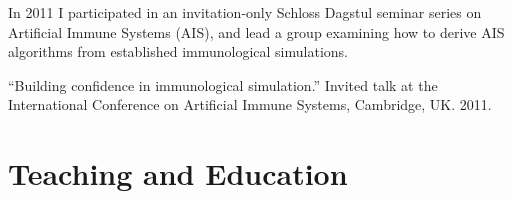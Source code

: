 \documentclass[a4paper]{article}
\begin{document}
In 2011 I participated in an invitation-only Schloss Dagstul seminar series on Artificial Immune Systems (AIS), and lead a group examining how to derive AIS algorithms from established immunological simulations.

``Building confidence in immunological simulation.'' Invited talk at the International Conference on Artificial Immune Systems, Cambridge, UK. 2011.


\section*{Teaching and Education}




\end{document}
